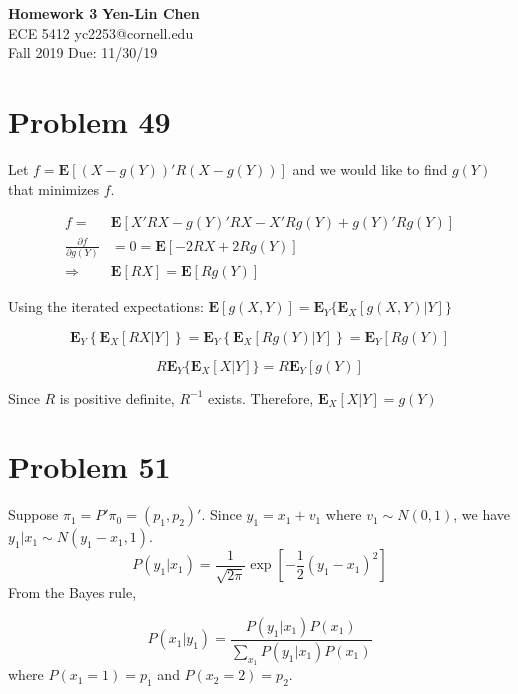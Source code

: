 \documentclass[a4paper, 11pt]{article}
\begin{document}
\noindent
\large\textbf{Homework 3} \hfill \textbf{Yen-Lin Chen} \\
\normalsize ECE 5412 \hfill yc2253@cornell.edu \\
Fall 2019 \hfill Due: 11/30/19\\

\section*{Problem 49}

Let $f = \mathbf{E}[(X-g(Y))'R(X-g(Y))]$ and we would like to find $g(Y)$ that minimizes $f$. 

\begin{equation}
\begin{split}
f = & \mathbf{E}[X'RX - g(Y)'RX - X'Rg(Y) + g(Y)'Rg(Y)]\\
\frac{\partial f}{\partial g(Y)} & = 0 = \mathbf{E}[-2RX + 2Rg(Y)]\\
\Longrightarrow & \mathbf{E}[RX] = \mathbf{E}[Rg(Y)]
\end{split}
\end{equation}

Using the iterated expectations: $\mathbf{E}[g(X,Y)] = \mathbf{E}_Y\{\mathbf{E}_X[g(X,Y)|Y]\}$

\begin{equation}
\mathbf{E}_Y\left\{ \mathbf{E}_X [RX | Y] \right\} = \mathbf{E}_Y\left\{ \mathbf{E}_X [Rg(Y) | Y] \right\} = \mathbf{E}_Y[Rg(Y)]
\end{equation}

\begin{equation}
R\mathbf{E}_Y\{\mathbf{E}_X[X|Y] \} = R\mathbf{E}_Y[g(Y)]
\end{equation}


Since $R$ is positive definite, $R^{-1}$ exists. Therefore, $\mathbf{E}_X[X|Y] = g(Y)$


\section*{Problem 51}

Suppose $\pi_1 = P'\pi_0 = (p_1, p_2)'$. Since $y_1 = x_1 + v_1$ where $v_1 \sim N(0,1 )$, we have $y_1|x_1 \sim N(y_1-x_1, 1)$. 
\begin{equation}
P(y_1|x_1) = \frac{1}{\sqrt{2\pi}}\exp\left[{-\frac{1}{2}(y_1-x_1)^2}\right]
\end{equation}
From the Bayes rule, 

\begin{equation}
P(x_1|y_1) = \frac{P(y_1|x_1)P(x_1)}{\sum_{x_1}P(y_1|x_1)P(x_1)}
\end{equation}
where $P(x_1=1) = p_1$ and $P(x_2=2) = p_2$.
\end{document}
